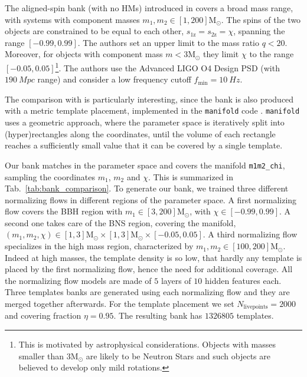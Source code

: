 \documentclass[twocolumn,showpacs,preprintnumbers,nofootinbib,prd,
superscriptaddress,10pt]{revtex4-2}
\begin{document}
The aligned-spin bank (with no HMs) introduced in \cite{Sakon:2022ibh} covers a broad mass range, with systems with component masses $m_1, m_2 \in [1,200] \mathrm{M_\odot}$. The spins of the two objects are constrained to be equal to each other, ${s_\text{1z} = s_\text{2z} = \chi}$, spanning the range $[-0.99, 0.99]$.
The authors set an upper limit to the mass ratio $q<20$. Moreover, for objects with component mass $m<3  \mathrm{M_\odot}$ they limit $\chi$ to the range $[-0.05, 0.05]$\footnote{This is motivated by astrophysical considerations. Objects with masses smaller than $3  \mathrm{M_\odot}$ are likely to be Neutron Stars and such objects are believed to develop only mild rotations.}.
The authors use the Advanced LIGO O4 Design PSD (with $\SI{190}{Mpc}$ range) \cite{O4_PSDs} and consider a low frequency cutoff ${f_\text{min} = \SI{10}{Hz}}$.

The comparison with \cite{Sakon:2022ibh} is particularly interesting, since the bank is also produced with a metric template placement, implemented in the \texttt{manifold} code \cite{Hanna:2022zpk}. \texttt{manifold} uses a geometric approach, where the parameter space is iteratively split into (hyper)rectangles along the coordinates, until the volume of each rectangle reaches a sufficiently small value that it can be covered by a single template.

Our bank matches \cite{Sakon:2022ibh} in the parameter space and covers the manifold \texttt{m1m2\_chi}, sampling the coordinates $m_1$, $m_2$ and $\chi$. This is summarized in Tab.~\ref{tab:bank_comparison}.
To generate our bank, we trained three different normalizing flows in different regions of the parameter space. A first normalizing flow covers the BBH region with $m_1 \in [3,200] \mathrm{M_\odot}$, with $\chi \in [-0.99, 0.99]$. A second one takes care of the BNS region, covering the manifold, ${(m_1, m_2, \chi) \in [1,3]\mathrm{M_\odot}\times[1,3]\mathrm{M_\odot}\times [-0.05, 0.05]}$.
A third normalizing flow specializes in the high mass region, characterized by $m_1, m_2 \in [100,200] \mathrm{M_\odot}$. Indeed at high masses, the template density is so low, that hardly any template is placed by the first normalizing flow, hence the need for additional coverage.
All the normalizing flow models are made of $5$ layers of $10$ hidden features each.
Three templates banks are generated using each normalizing flow and they are merged together afterwards.
For the template placement we set $N_\text{livepoints} = 2000$ and covering fraction $\eta = 0.95$.
The resulting bank has $1326805$ templates.
\end{document}
